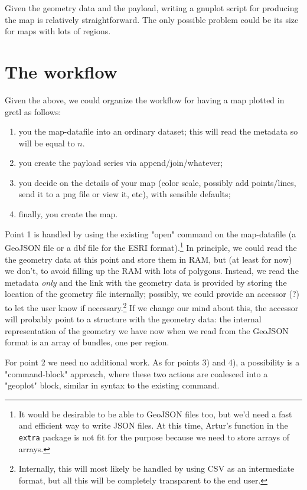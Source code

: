 \documentclass{article}
\begin{document}
Given the geometry data and the payload, writing a gnuplot script for
producing the map is relatively straightforward. The only possible
problem could be its size for maps with lots of regions.

\section{The workflow}
\label{sec:workflow}

Given the above, we could organize the workflow for having a map
plotted in gretl as follows:

\begin{enumerate}
\item you  the map-datafile into an ordinary dataset; this
  will read the metadata so  will be equal to $n$.
\item you create the payload series via append/join/whatever;
\item you decide on the details of your map (color scale, possibly
  add points/lines, send it to a png file or view it, etc), with
  sensible defaults;
\item finally, you create the map. 
\end{enumerate}

Point 1 is handled by using the existing "open" command on the
map-datafile (a GeoJSON file or a dbf file for the ESRI
format).\footnote{It would be desirable to be able to 
  GeoJSON files too, but we'd need a fast and efficient way to write
  JSON files. At this time, Artur's function in the \texttt{extra}
  package is not fit for the purpose because we need to store arrays
  of arrays.} In principle, we could read the the geometry data at
this point and store them in RAM, but (at least for now) we don't, to
avoid filling up the RAM with lots of polygons. Instead, we read the
metadata \emph{only} and the link with the geometry data is provided
by storing the location of the geometry file internally; possibly, we
could provide an accessor (?)  to let the user know if
necessary.\footnote{Internally, this will most likely be handled by
  using CSV as an intermediate format, but all this will be completely
  transparent to the end user.} If we change our mind about this, the
 accessor will probably point to a structure with the
geometry data: the internal representation of the geometry we have now
when we read from the GeoJSON format is an array of bundles, one per
region.

For point 2 we need no additional work. As for points 3) and 4), a
possibility is a "command-block" approach, where these two actions are
coalesced into a "geoplot" block, similar in syntax to the existing
 command.
\end{document}
